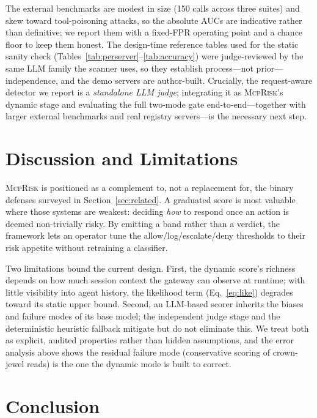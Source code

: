 \documentclass[conference]{IEEEtran}
\newcommand{\framework}{\textsc{McpRisk}}
\begin{document}
The external benchmarks are modest in size (150 calls across three suites) and skew
toward tool-poisoning attacks, so the absolute AUCs are indicative rather than
definitive; we report them with a fixed-FPR operating point and a chance floor to
keep them honest. The design-time reference tables used for the static sanity check
(Tables~\ref{tab:perserver}--\ref{tab:accuracy}) were judge-reviewed by the same LLM
family the scanner uses, so they establish process---not prior---independence, and
the demo servers are author-built. Crucially, the request-aware detector we report
is a \emph{standalone LLM judge}; integrating it as \framework's dynamic stage and
evaluating the full two-mode gate end-to-end---together with larger external
benchmarks and real registry servers---is the necessary next step.

\section{Discussion and Limitations}
\label{sec:discussion}

\framework{} is positioned as a complement to, not a replacement for, the binary
defenses surveyed in Section~\ref{sec:related}. A graduated score is most valuable
where those systems are weakest: deciding \emph{how} to respond once an action is
deemed non-trivially risky. By emitting a band rather than a verdict, the framework
lets an operator tune the allow/log/escalate/deny thresholds to their risk
appetite without retraining a classifier.

Two limitations bound the current design. First, the dynamic score's richness
depends on how much session context the gateway can observe at runtime; with little
visibility into agent history, the likelihood term (Eq.~\ref{eq:like}) degrades
toward its static upper bound. Second, an LLM-based scorer inherits the biases and
failure modes of its base model; the independent judge stage and the deterministic
heuristic fallback mitigate but do not eliminate this. We treat both as explicit,
audited properties rather than hidden assumptions, and the error analysis above
shows the residual failure mode (conservative scoring of crown-jewel reads) is the
one the dynamic mode is built to correct.

\section{Conclusion}
\label{sec:conclusion}
\end{document}
